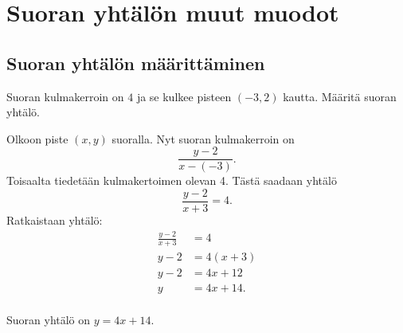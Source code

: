 \section{Suoran yhtälön muut muodot}





\subsection*{Suoran yhtälön määrittäminen}

\begin{esimerkki}
Suoran kulmakerroin on $4$ ja se kulkee pisteen $(-3, 2)$ kautta. Määritä suoran yhtälö.

\begin{esimratk}
Olkoon piste $(x, y)$ suoralla. Nyt suoran kulmakerroin on 
\[
\frac{y-2}{x-(-3)}.
\]
Toisaalta tiedetään kulmakertoimen olevan 4. Tästä saadaan yhtälö
\[
\frac{y-2}{x+3}=4.
\]
Ratkaistaan yhtälö:
\begin{align*}
\frac{y-2}{x+3}&=4 \\
y-2&=4(x+3) \\
y-2&=4x+12 \\
y&=4x+14. \\
\end{align*}
\end{esimratk}

\begin{esimvast}
Suoran yhtälö on $y=4x+14$.
\end{esimvast}
\end{esimerkki}

